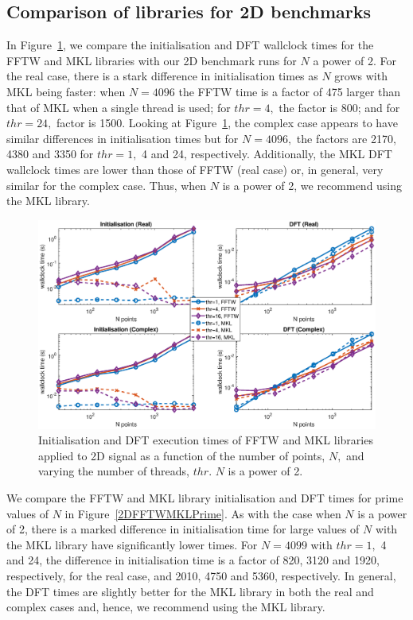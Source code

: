 \documentclass[a4paper]{article}
\begin{document}
\subsection{Comparison of libraries for 2D benchmarks}\label{Sec:2DComp}

In Figure~\ref{2DFFTWMKL2}, we compare the initialisation and DFT
wallclock times for the FFTW and MKL libraries with our 2D benchmark
runs for $N$ a power of 2. For the real case, there is a stark
difference in initialisation times as $N$ grows with MKL being faster:
when $N=4096$ the FFTW time is a factor of 475 larger than that of MKL
when a single thread is used; for $thr=4,$ the factor is 800; and for
$thr=24,$ factor is 1500. Looking at Figure~\ref{2DFFTWMKL2}, the
complex case appears to have similar differences in initialisation
times but for $N=4096,$ the factors are 2170, 4380 and 3350 for
$thr=1,$ 4 and 24, respectively. Additionally, the MKL DFT wallclock
times are lower than those of FFTW (real case) or, in general, very
similar for the complex case. Thus, when $N$ is a power of 2, we
recommend using the MKL library.


\begin{figure}[htb]
    \centering
    \includegraphics[width=\linewidth]{../results/fftw_mkl_2_2d_thr.eps}
  \caption{Initialisation and DFT execution times of FFTW and MKL libraries applied to 2D signal as a function of the
    number of points, $N,$ and varying the number of threads, $thr.$ $N$ is a power of 2.}
  \label{2DFFTWMKL2}
\end{figure}


We compare the FFTW and MKL library initialisation and DFT times for
prime values of $N$ in Figure~\ref{2DFFTWMKLPrime}. As with the case
when $N$ is a power of 2, there is a marked difference in
initialisation time for large values of $N$ with the MKL library have
significantly lower times. For $N=4099$ with $thr=1,$ 4 and 24, the
difference in initialisation time is a factor of 820, 3120 and 1920,
respectively, for the real case, and 2010, 4750 and 5360,
respectively. In general, the DFT times are slightly better for the
MKL library in both the real and complex cases and, hence, we
recommend using the MKL library.
\end{document}
